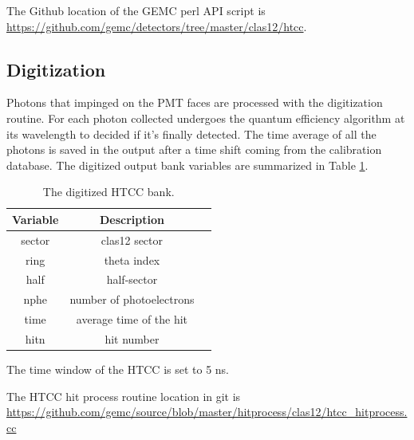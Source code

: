 The Github location of the GEMC perl API script is \url{https://github.com/gemc/detectors/tree/master/clas12/htcc}.



\subsection{Digitization}
Photons that impinged on the PMT faces are processed with the digitization routine.
For each photon collected undergoes the quantum efficiency algorithm at its wavelength to decided if it's finally detected.
The time average of all the photons is saved in the output after a time shift coming from the calibration database.
The digitized output bank variables are summarized in Table \ref{tab:htccBank}.

\begin{table}[h]
	\begin{center}
		\begin{tabular}{| c | c | c |}
			\hline \hline
			Variable         & Description    \\
			\hline
             sector &                                     clas12 sector     \\
             ring   &                                       theta index     \\
             half   &                                       half-sector     \\
             nphe   &                          number of photoelectrons     \\
             time   &                           average time of the hit     \\
             hitn   &                                        hit number     \\
			\hline \hline
		\end{tabular}
	\end{center}
	\caption{The digitized HTCC bank.}\label{tab:htccBank}
\end{table}

The time window  of the HTCC is set to 5 ns.

The HTCC hit process routine location in git is \url{https://github.com/gemc/source/blob/master/hitprocess/clas12/htcc_hitprocess.cc}
